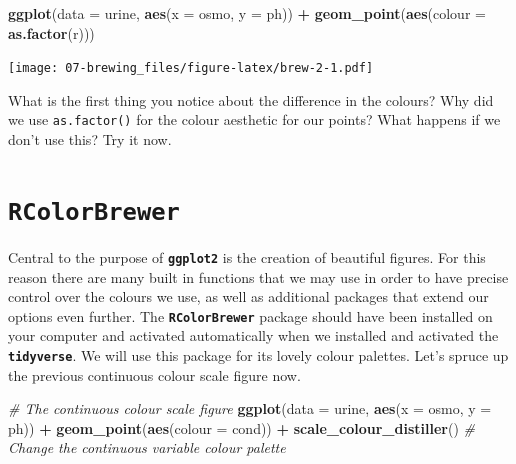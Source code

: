 \documentclass[
]{book}
\newenvironment{Shaded}{\begin{snugshade}}{\end{snugshade}}
\newcommand{\CommentTok}[1]{\textcolor[rgb]{0.56,0.35,0.01}{\textit{#1}}}
\newcommand{\DataTypeTok}[1]{\textcolor[rgb]{0.13,0.29,0.53}{#1}}
\newcommand{\KeywordTok}[1]{\textcolor[rgb]{0.13,0.29,0.53}{\textbf{#1}}}
\newcommand{\NormalTok}[1]{#1}
\newcommand{\OperatorTok}[1]{\textcolor[rgb]{0.81,0.36,0.00}{\textbf{#1}}}
\newcommand{\StringTok}[1]{\textcolor[rgb]{0.31,0.60,0.02}{#1}}
\begin{document}
\begin{Shaded}
\begin{Highlighting}[]
\KeywordTok{ggplot}\NormalTok{(}\DataTypeTok{data =}\NormalTok{ urine, }\KeywordTok{aes}\NormalTok{(}\DataTypeTok{x =}\NormalTok{ osmo, }\DataTypeTok{y =}\NormalTok{ ph)) }\OperatorTok{+}
\StringTok{  }\KeywordTok{geom\_point}\NormalTok{(}\KeywordTok{aes}\NormalTok{(}\DataTypeTok{colour =} \KeywordTok{as.factor}\NormalTok{(r)))}
\end{Highlighting}
\end{Shaded}

\texttt{[image: 07-brewing\_files/figure-latex/brew-2-1.pdf]}

What is the first thing you notice about the difference in the colours? Why did we use \texttt{as.factor()} for the colour aesthetic for our points? What happens if we don't use this? Try it now.

\hypertarget{rcolorbrewer}{%
\section{\texorpdfstring{\textbf{\texttt{RColorBrewer}}}{RColorBrewer}}\label{rcolorbrewer}}

Central to the purpose of \textbf{\texttt{ggplot2}} is the creation of beautiful figures. For this reason there are many built in functions that we may use in order to have precise control over the colours we use, as well as additional packages that extend our options even further. The \textbf{\texttt{RColorBrewer}} package should have been installed on your computer and activated automatically when we installed and activated the \textbf{\texttt{tidyverse}}. We will use this package for its lovely colour palettes. Let's spruce up the previous continuous colour scale figure now.

\begin{Shaded}
\begin{Highlighting}[]
\CommentTok{\# The continuous colour scale figure}
\KeywordTok{ggplot}\NormalTok{(}\DataTypeTok{data =}\NormalTok{ urine, }\KeywordTok{aes}\NormalTok{(}\DataTypeTok{x =}\NormalTok{ osmo, }\DataTypeTok{y =}\NormalTok{ ph)) }\OperatorTok{+}
\StringTok{  }\KeywordTok{geom\_point}\NormalTok{(}\KeywordTok{aes}\NormalTok{(}\DataTypeTok{colour =}\NormalTok{ cond)) }\OperatorTok{+}
\StringTok{  }\KeywordTok{scale\_colour\_distiller}\NormalTok{() }\CommentTok{\# Change the continuous variable colour palette}
\end{Highlighting}
\end{Shaded}
\end{document}
